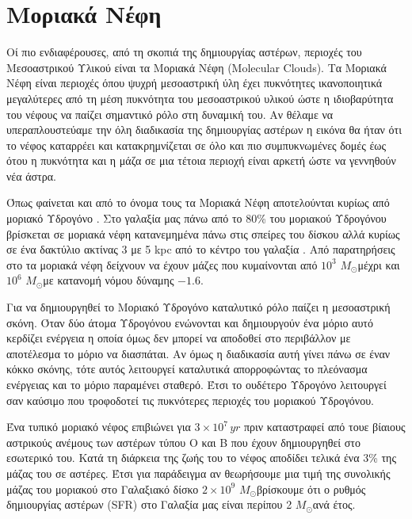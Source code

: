 \documentclass[a4paper,12pt]{memoir}
\newcommand{\sm}{$M_{\odot}$}
\begin{document}
	
\section{Μοριακά Νέφη}
Οί πιο ενδιαφέρουσες, από τη σκοπιά της δημιουργίας αστέρων, περιοχές του Μεσοαστρικού Υλικού είναι τα Μοριακά Νέφη (Molecular Clouds).
Τα Μοριακά Νέφη είναι περιοχές όπου ψυχρή μεσοαστρική ύλη έχει πυκνότητες ικανοποιητικά μεγαλύτερες  από τη μέση πυκνότητα του μεσοαστρικού υλικού ώστε η ιδιοβαρύτητα του νέφους να παίζει σημαντικό ρόλο στη δυναμική του. 
Αν θέλαμε να υπεραπλουστεύαμε την όλη διαδικασία της δημιουργίας αστέρων η εικόνα θα ήταν ότι το νέφος καταρρέει και κατακρημνίζεται σε όλο και πιο συμπυκνωμένες δομές έως ότου η πυκνότητα και η μάζα σε μια τέτοια περιοχή είναι αρκετή ώστε να γεννηθούν νέα άστρα.   

Όπως φαίνεται και από το όνομα τους τα Μοριακά Νέφη αποτελούνται κυρίως από μοριακό Υδρογόνο . Στο γαλαξία μας πάνω από το 80\% του μοριακού Υδρογόνου βρίσκεται σε μοριακά νέφη κατανεμημένα πάνω στις σπείρες του δίσκου αλλά κυρίως σε ένα δακτύλιο ακτίνας 3 με 5 kpc από το κέντρο του γαλαξία .  Από παρατηρήσεις στο  τα μοριακά νέφη δείχνουν να έχουν μάζες που κυμαίνονται από $10^3$ \sm μέχρι και $10^6$ \sm με κατανομή νόμου δύναμης $-1.6$. \cite{stahlern_2004}

Για να δημιουργηθεί το Μοριακό Υδρογόνο καταλυτικό ρόλο παίζει η μεσοαστρική σκόνη.  Όταν δύο άτομα Υδρογόνου ενώνονται και δημιουργούν ένα μόριο  αυτό κερδίζει ενέργεια η οποία όμως δεν μπορεί να αποδοθεί στο περιβάλλον με αποτέλεσμα το μόριο να διασπάται. Αν όμως η διαδικασία αυτή γίνει πάνω σε έναν κόκκο σκόνης, τότε αυτός λειτουργεί καταλυτικά απορροφώντας το πλεόνασμα ενέργειας και το μόριο παραμένει σταθερό. Έτσι το ουδέτερο Υδρογόνο λειτουργεί σαν καύσιμο που τροφοδοτεί τις πυκνότερες περιοχές του μοριακού Υδρογόνου. 

Ένα τυπικό μοριακό νέφος επιβιώνει για $3\times 10^7 \, yr$ πριν καταστραφεί από τουε βίαιους αστρικούς ανέμους των αστέρων τύπου O και B που έχουν δημιουργηθεί στο εσωτερικό του. Κατά τη διάρκεια της ζωής του το νέφος αποδίδει τελικά ένα 3\% της μάζας του σε αστέρες. Έτσι για παράδειγμα αν θεωρήσουμε μια τιμή της συνολικής μάζας του μοριακού  στο Γαλαξιακό δίσκο $2\times 10^9$ \sm βρίσκουμε ότι ο ρυθμός δημιουργίας αστέρων (SFR) στο Γαλαξία μας είναι περίπου 2 \sm ανά έτος.  
\end{document}
